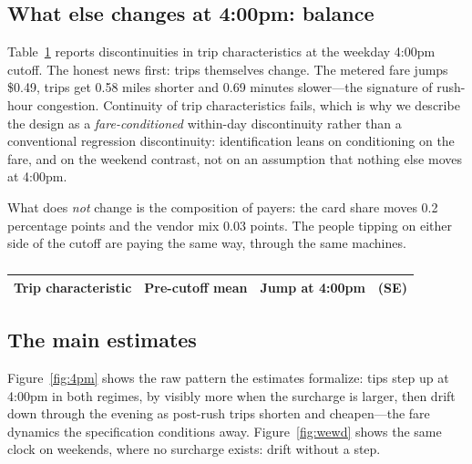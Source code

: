 \subsection{What else changes at 4:00pm: balance}
\label{sec:results-balance}
Table~\ref{tab:balance} reports discontinuities in trip characteristics
at the weekday 4:00pm cutoff. The honest news first: trips themselves
change. The metered fare jumps \$0.49, trips get 0.58 miles shorter and
0.69 minutes slower---the signature of rush-hour congestion. Continuity
of trip characteristics fails, which is why we describe the design as a
\emph{fare-conditioned} within-day discontinuity rather than a
conventional regression discontinuity: identification leans on
conditioning on the fare, and on the weekend contrast, not on an
assumption that nothing else moves at 4:00pm.

What does \emph{not} change is the composition of payers: the card share
moves 0.2 percentage points and the vendor mix 0.03 points. The people
tipping on either side of the cutoff are paying the same way, through
the same machines.

\begin{table}[!htbp]
  \centering
  \singlespacing
  \caption{}
  \label{tab:balance}
  \small
  \begin{tabular}{@{}lccc@{}}
    \toprule
    Trip characteristic & Pre-cutoff mean & Jump at 4:00pm & (SE) \\
    \midrule
    
    \bottomrule
  \end{tabular}
\end{table}

\subsection{The main estimates}
Figure~\ref{fig:4pm} shows the raw pattern the estimates formalize: tips
step up at 4:00pm in both regimes, by visibly more when the surcharge is
larger, then drift down through the evening as post-rush trips shorten
and cheapen---the fare dynamics the specification conditions away.
Figure~\ref{fig:wewd} shows the same clock on weekends, where no
surcharge exists: drift without a step.

